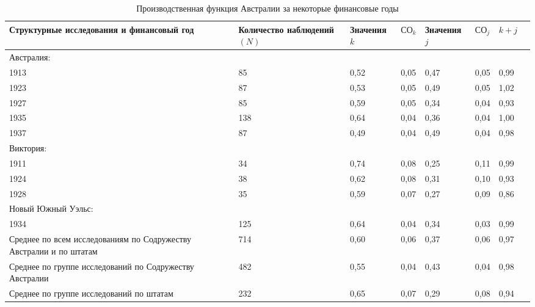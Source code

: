 \documentclass{article}
\begin{document}
\begin{table}[!t]
\centering
\footnotesize{
\caption{Производственная функция Австралии за некоторые финансовые годы}%
\label{tab2}%
\begin{tabular}{p{}p{}p{}p{}p{}p{}p{}p{0pt}}
\toprule
\toprule
\centering Структурные исследования и финансовый год & \centering Количество наблюдений \((N)\) & \centering Значения \(k\) & \centering \(\text{СО}_k\) & \centering Значения \(j\) & \centering \(\text{СО}_j\) & \centering \(k + j\) & \\
\midrule
Австралия: & & & & & &  & \\
\hspace{3mm} 1913 & \hfil 85 & \hfil 0,52 & 0,05 & \hfil 0,47 & 0,05 & 0,99 & \\
\hspace{3mm} 1923 & \hfil 87 & \hfil 0,53 & 0,05 & \hfil 0,49 & 0,05 & 1,02 & \\
\hspace{3mm} 1927 & \hfil 85 & \hfil 0,59 & 0,05 & \hfil 0,34 & 0,04 & 0,93 & \\
\hspace{3mm} 1935 & \hfil 138 \phantom{\,} & \hfil 0,64 & 0,04 & \hfil 0,36 & 0,04 & 1,00 & \\
\hspace{3mm} 1937 & \hfil 87 & \hfil 0,49 & 0,04 & \hfil 0,49 & 0,04 & 0,98 & \\
Виктория: & & & & & &  & \\
\hspace{3mm} 1911 & \hfil 34 & \hfil 0,74 & 0,08 & \hfil 0,25 & 0,11 & 0,99 & \\
\hspace{3mm} 1924 & \hfil 38 & \hfil 0,62 & 0,08 & \hfil 0,31 & 0,10 & 0,93 & \\
\hspace{3mm} 1928 & \hfil 35 & \hfil 0,59 & 0,07 & \hfil 0,27 & 0,09 & 0,86 & \\
Новый Южный Уэльс: & & & & & &  & \\
\hspace{3mm} 1934 & \hfil 125 \phantom{\,} & \hfil 0,64 & 0,04 & \hfil 0,34 & 0,03 & 0,99 & \\
Среднее по всем исследованиям по Содружеству Австралии и по штатам & \hfil 714 \phantom{\,} & \hfil 0,60 & 0,06 & \hfil 0,37 & 0,06 & 0,97 & \\
Среднее по группе исследований по Содружеству Австралии & \hfil 482 \phantom{\,} & \hfil 0,55 & 0,04 & \hfil 0,43 & 0,04 & 0,98 & \\
Среднее по группе исследований по штатам & \hfil 232 \phantom{\,} & \hfil 0,65 & 0,07 & \hfil 0,29 & 0,08 & 0,94 & \\

\bottomrule

\end{tabular}
}
\end{table}
\end{document}
